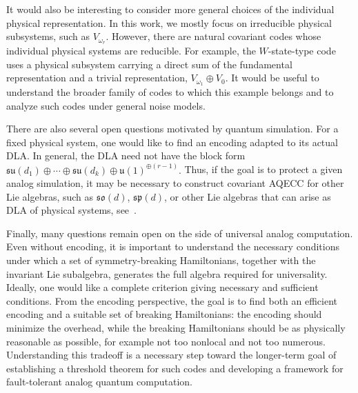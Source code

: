 \documentclass[10pt,twocolumn,superscriptaddress,aps,amsmath,amssymb,citeautoscript,floatfix,prx,longbibliography]{revtex4-2}
\newcounter{alg}
\theoremstyle{plain}
\theoremstyle{plain}
\theoremstyle{plain}
\theoremstyle{plain}
\theoremstyle{plain}
\theoremstyle{plain}
\begin{document}
It would also be interesting to consider more general choices of the individual physical representation. In this work, we mostly focus on irreducible physical subsystems, such as \(V_{\omega_r}\). However, there are natural covariant codes whose individual physical systems are reducible. For example, the \(W\)-state-type code~\cite{Faist2020, Alexander2025} uses a physical subsystem carrying a direct sum of the fundamental representation and a trivial representation,
$
    V_{\omega_1}\oplus V_0.
$
It would be useful to understand the broader family of codes to which this example belongs and to analyze such codes under general noise models.

There are also several open questions motivated by quantum simulation. For a fixed physical system, one would like to find an encoding adapted to its actual DLA. In general, the DLA need not have the block form
$
    \mathfrak{su}(d_1)\oplus\cdots\oplus\mathfrak{su}(d_k)
    \oplus
    \mathfrak{u}(1)^{\oplus(r-1)}.
$
Thus, if the goal is to protect a given analog simulation, it may be necessary to construct covariant AQECC for other Lie algebras, such as \(\mathfrak{so}(d)\), \(\mathfrak{sp}(d)\), or other Lie algebras that can arise as DLA of physical systems, see~\cite{Kokcu2024, Wiersema2024}.

Finally, many questions remain open on the side of universal analog computation. Even without encoding, it is important to understand the necessary conditions under which a set of symmetry-breaking Hamiltonians, together with the invariant Lie subalgebra, generates the full algebra required for universality. Ideally, one would like a complete criterion giving necessary and sufficient conditions. From the encoding perspective, the goal is to find both an efficient encoding and a suitable set of breaking Hamiltonians: the encoding should minimize the overhead, while the breaking Hamiltonians should be as physically reasonable as possible, for example not too nonlocal and not too numerous. Understanding this tradeoff is a necessary step toward the longer-term goal of establishing a threshold theorem for such codes and developing a framework for fault-tolerant analog quantum computation.

 
\end{document}
